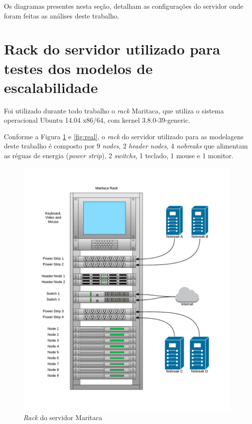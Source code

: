 Os diagramas presentes nesta seção, detalham as configurações do servidor onde foram feitas as análises deste trabalho. 

\section{Rack do servidor utilizado para testes dos modelos de escalabilidade}

Foi utilizado durante todo trabalho o \textit{rack} Maritaca, que utiliza o sistema operacional Ubuntu 14.04 x86/64, com kernel 3.8.0-39-generic.

Conforme a Figura \ref{fig:maritaca-rack} e \ref{fig:real}, o \textit{rack} do servidor utilizado para as modelagens deste trabalho é composto por 9 \textit{nodes}, 2 \textit{header nodes}, 4 \textit{nobreaks} que alimentam as réguas de energia (\textit{power strip}), 2 \textit{switchs}, 1 teclado, 1 mouse e 1 monitor.

    \begin{figure}[htb]
    \centering
    \includegraphics[scale=0.6]{imagens/maritaca-rack.pdf}
    \caption{\textit{Rack} do servidor Maritaca}
    \label{fig:maritaca-rack}
    \end{figure}


